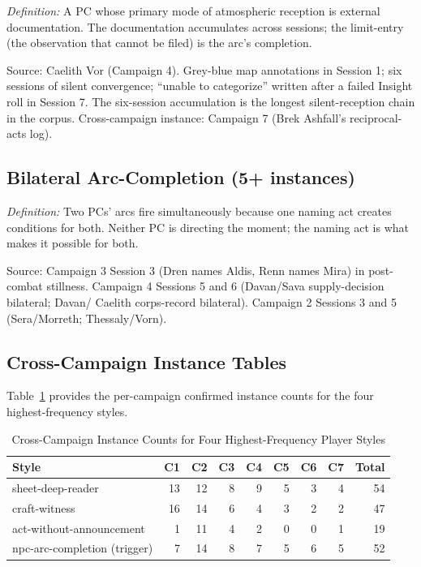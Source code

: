 \textit{Definition:} A PC whose primary mode of atmospheric reception is external
documentation. The documentation accumulates across sessions; the limit-entry (the
observation that cannot be filed) is the arc's completion.

Source: Caelith Vor (Campaign 4). Grey-blue map annotations in Session 1; six sessions
of silent convergence; ``unable to categorize'' written after a failed Insight roll
in Session 7. The six-session accumulation is the longest silent-reception chain in
the corpus. Cross-campaign instance: Campaign 7 (Brek Ashfall's reciprocal-acts log).

\subsection{Bilateral Arc-Completion (5+ instances)}

\textit{Definition:} Two PCs' arcs fire simultaneously because one naming act creates
conditions for both. Neither PC is directing the moment; the naming act is what
makes it possible for both.

Source: Campaign 3 Session 3 (Dren names Aldis, Renn names Mira) in post-combat
stillness. Campaign 4 Sessions 5 and 6 (Davan/Sava supply-decision bilateral; Davan/
Caelith corps-record bilateral). Campaign 2 Sessions 3 and 5 (Sera/Morreth; Thessaly/Vorn).

\subsection{Cross-Campaign Instance Tables}

Table~\ref{tab:cross-campaign-styles} provides the per-campaign confirmed instance counts for the four
highest-frequency styles.

\begin{table}[t]
\caption{Cross-Campaign Instance Counts for Four Highest-Frequency Player Styles}
\label{tab:cross-campaign-styles}
\begin{tabular}{@{}lrrrrrrrr@{}}
\toprule
Style & C1 & C2 & C3 & C4 & C5 & C6 & C7 & Total \\
\midrule
sheet-deep-reader & 13 & 12 & 8 & 9 & 5 & 3 & 4 & 54 \\
craft-witness & 16 & 14 & 6 & 4 & 3 & 2 & 2 & 47 \\
act-without-announcement & 1 & 11 & 4 & 2 & 0 & 0 & 1 & 19 \\
npc-arc-completion (trigger) & 7 & 14 & 8 & 7 & 5 & 6 & 5 & 52 \\
\bottomrule
\end{tabular}
\end{table}

